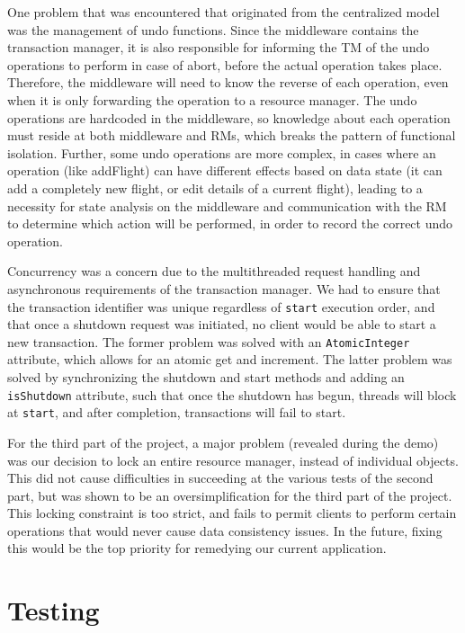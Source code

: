\documentclass[11pt]{article}
\begin{document}
One problem that was encountered that originated from the centralized model was the management of undo functions. Since the middleware contains the transaction manager, it is also responsible for informing the TM of the undo operations to perform in case of abort, before the actual operation takes place. Therefore, the middleware will need to know the reverse of each operation, even when it is only forwarding the operation to a resource manager. The undo operations are hardcoded in the middleware, so knowledge about each operation must reside at both middleware and RMs, which breaks the pattern of functional isolation. Further, some undo operations are more complex, in cases where an operation (like addFlight) can have different effects based on data state (it can add a completely new flight, or edit details of a current flight), leading to a necessity for state analysis on the middleware and communication with the RM to determine which action will be performed, in order to record the correct undo operation. \par

Concurrency was a concern due to the multithreaded request handling and asynchronous requirements of the transaction manager. We had to ensure that the transaction identifier was unique regardless of \texttt{start} execution order, and that once a shutdown request was initiated, no client would be able to start a new transaction. The former problem was solved with an \texttt{AtomicInteger} attribute, which allows for an atomic get and increment. The latter problem was solved by synchronizing the shutdown and start methods and adding an \texttt{isShutdown} attribute, such that once the shutdown has begun, threads will block at \texttt{start}, and after completion, transactions will fail to start. \par

For the third part of the project, a major problem (revealed during the demo) was our decision to lock an entire resource manager, instead of individual objects. This did not cause difficulties in succeeding at the various tests of the second part, but was shown to be an oversimplification for the third part of the project. This locking constraint is too strict, and fails to permit clients to perform certain operations that would never cause data consistency issues. In the future, fixing this would be the top priority for remedying our current application.\par

\section*{Testing}
\end{document}
